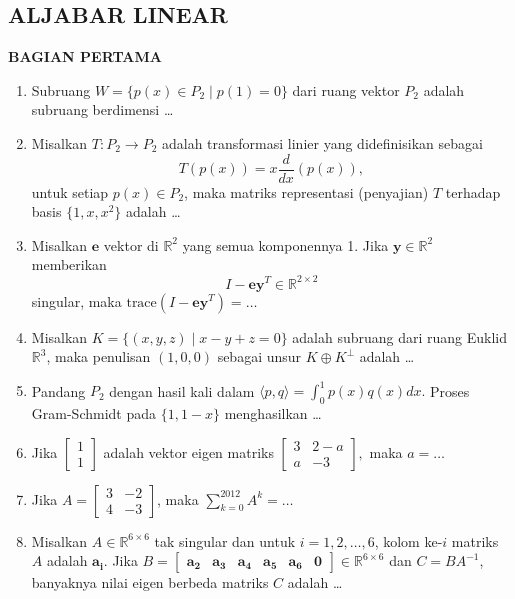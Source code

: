 \documentclass[12pt,twoside]{article}
\begin{document}
\subsection{ALJABAR LINEAR}
\textbf{BAGIAN PERTAMA}
\begin{enumerate}
	\item Subruang \( W = \{ p(x) \in P_2 \mid p(1) = 0 \} \) dari ruang vektor \( P_2 \) adalah subruang berdimensi \dots

	\item Misalkan \( T: P_2 \to P_2 \) adalah transformasi linier yang didefinisikan sebagai
	      \[
		      T (p(x)) = x \frac{d}{dx} (p(x)),
	      \]
	      untuk setiap \( p(x) \in P_2 \), maka matriks representasi (penyajian) \( T \) terhadap basis \( \{1, x, x^2\} \) adalah \dots

	\item Misalkan \( \mathbf{e} \) vektor di \( \mathbb{R}^2 \) yang semua komponennya 1. Jika \( \mathbf{y} \in \mathbb{R}^2 \) memberikan
	      \[
		      I-\mathbf{ey}^T \in \mathbb{R}^{2 \times 2}
	      \]
	      singular, maka \( \text{trace}(I-\mathbf{ey}^T) = \dots \)

	\item Misalkan \( K = \{ (x,y,z) \mid x - y + z = 0 \} \) adalah subruang dari ruang Euklid \( \mathbb{R}^3 \), maka penulisan \( (1,0,0) \) sebagai unsur \( K \oplus K^\perp \) adalah \dots

	\item Pandang \( P_2 \) dengan hasil kali dalam \(\displaystyle \langle p, q \rangle = \int_0^1 p(x)q(x)dx.\) Proses Gram-Schmidt pada \( \{1, 1-x\} \) menghasilkan \dots

	\item Jika \(\begin{bmatrix} 1 \\ 1 \end{bmatrix}\) adalah vektor eigen matriks \(\begin{bmatrix} 3 & 2-a \\ a & -3 \end{bmatrix},\) maka \( a = \dots \)

	\item Jika \(A = \begin{bmatrix} 3 & -2 \\ 4 & -3 \end{bmatrix}\), maka \(\sum_{k=0}^{2012} A^k = \dots\)

	\item Misalkan \( A \in \mathbb{R}^{6 \times 6} \) tak singular dan untuk \( i = 1,2,\dots,6 \), kolom ke-\( i \) matriks \( A \) adalah \( \mathbf{a_i} \). Jika \(B = \begin{bmatrix} \mathbf{a_2} & \mathbf{a_3} & \mathbf{a_4} & \mathbf{a_5} & \mathbf{a_6} & \mathbf{0} \end{bmatrix} \in \mathbb{R}^{6 \times 6}\) dan \( C = BA^{-1} \), banyaknya nilai eigen berbeda matriks \( C \) adalah \dots
\end{enumerate}
\end{document}
